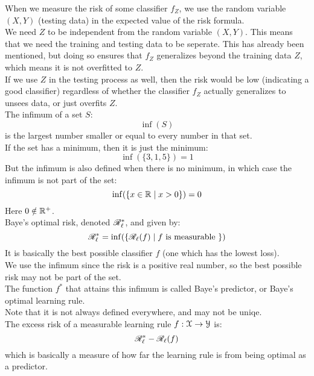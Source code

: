 \documentclass[12pt]{article}
\begin{document}
When we measure the risk of some
classifier $f_Z$,
we use the random variable $(X, Y)$
(testing data)
in the expected value of the risk formula. \\
We need $Z$ to be independent from 
the random variable $(X, Y)$.
This means that we need the training and testing
data to be seperate.
This has already been mentioned,
but doing so ensures that $f_Z$
generalizes beyond the training data $Z$,
which means it is not overfitted to $Z$. \\
If we use $Z$ in the testing process
as well,
then the risk would be low
(indicating a good classifier)
regardless of whether the classifier $f_Z$
actually generalizes to unsees data,
or just overfits $Z$. \\


The infimum of a set $S$:
\[ \inf(S) \]
is the largest number smaller
or equal to every number in that set. \\
If the set has a minimum,
then it is just the minimum:
\[ \inf(\{3, 1, 5\}) = 1 \]
But the infimum is also defined
when there is no minimum,
in which case the infimum
is not part of the set:
\[ \inf(\{ x \in \mathbb{R} \mid x > 0 \})
= 0 \]
Here $0 \notin \mathbb{R}^+$. \\

Baye's optimal risk,
denoted $\mathscr{R}_\ell^*$,
and given by:
\[ \mathscr{R}_\ell^*
= \inf(\{ \mathscr{R}_\ell(f) \mid f
\text{ is measurable } \}) \]
It is basically the best possible
classifier $f$
(one which has the lowest loss). \\
We use the infimum since
the risk is a positive real number,
so the best possible risk may not be
part of the set. \\

The function $f^*$
that attains this infimum
is called Baye's predictor,
or Baye's optimal learning rule. \\
Note that it is not always 
defined everywhere,
and may not be uniqe. \\

The excess risk of a
measurable learning rule 
$f:\mathcal{X} \to \mathcal{Y}$ is: 
\[ \mathscr{R}_\ell^* - \mathscr{R}_\ell(f) \]
which is basically a measure
of how far the learning rule
is from being optimal
as a predictor. \\
\end{document}
